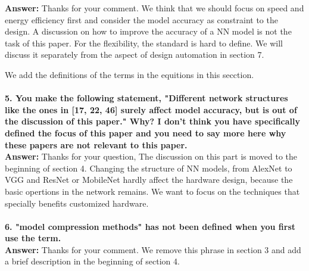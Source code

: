 \documentclass[12pt]{paper}
\newcommand{\rev}[1]{{{\color[rgb]{0,0,1}{#1}}}}
\newcommand{\answer}[1]{\noindent\textbf{Answer:} #1}
\newcommand{\comment}[1]{\noindent\textbf{#1}\\}
\begin{document}
\answer{Thanks for your comment. We think that we should focus on speed and energy efficiency first and consider the model accuracy as constraint to the design. A discussion on how to improve the accuracy of a NN model is not the task of this paper. For the flexibility, the standard is hard to define. We will discuss it separately from the aspect of design automation in section 7.

We add the definitions of the terms in the equitions in this secction. \\

\rev{Peak performance, measured in operations (multiplication or addition) per second, is achieved when all the computation units work every clock cycle. Utilization denotes the average ratio of working cycles of the computation units. The workload measures the number of operations in the target neural network.}}\\

\comment{5. You make the following statement, "Different network structures like the ones in [17, 22, 46] surely affect model accuracy, but is out of the discussion of this paper." Why? I don't think you have specifically defined the focus of this paper and you need to say more here why these papers are not relevant to this paper.}

\answer{Thanks for your question, The discussion on this part is moved to the beginning of section 4. Changing the structure of NN models, from AlexNet to VGG and ResNet or MobileNet hardly affect the hardware design, because the basic opertions in the network remains. We want to focus on the techniques that specially benefits customized hardware. \\

\rev{A larger NN model usually results in a higher model accuracy. This means it is possible to tradeoff between the model accuracy and the hardware speed or energy cost. Neural network researchers are designing more effcient network models from AlexNet [22] to ResNet [16], SqueezeNet [19] and MobileNet [18]. The main differences between these networks are the size of and the connections between each layer. The basic operations are the same and hardly affect the hardware design. For this reason, we will not focus on these techniques in this paper.}}\\

\comment{6. "model compression methods" has not been defined when you first use the term.}

\answer{Thanks for your comment. We remove this phrase in section 3 and add a brief description in the beginning of section 4.\\

\rev{Other methods try to achieve the tradeoff by compressing existing NN models. They try to reduce the number of weights or reduce the number of bits used for each activation or weight, which help reudce the computation and storage complexity. Corresponding hardware designs can benefit from these NN model compression methods. In this section, we investigate these hardware oriented network model compression methods.}}\\
\end{document}
